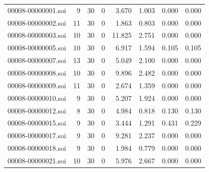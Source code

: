 \begin{tabular}{lrrrrrrr}
00008-00000001.soi & 9 & 30 & 0 & 3.670 & 1.003 & 0.000 & 0.000 \\
00008-00000002.soi & 11 & 30 & 0 & 1.863 & 0.803 & 0.000 & 0.000 \\
00008-00000003.soi & 10 & 30 & 0 & 11.825 & 2.751 & 0.000 & 0.000 \\
00008-00000005.soi & 10 & 30 & 0 & 6.917 & 1.594 & 0.105 & 0.105 \\
00008-00000007.soi & 13 & 30 & 0 & 5.049 & 2.100 & 0.000 & 0.000 \\
00008-00000008.soi & 10 & 30 & 0 & 9.896 & 2.482 & 0.000 & 0.000 \\
00008-00000009.soi & 11 & 30 & 0 & 2.674 & 1.359 & 0.000 & 0.000 \\
00008-00000010.soi & 9 & 30 & 0 & 5.207 & 1.924 & 0.000 & 0.000 \\
00008-00000012.soi & 8 & 30 & 0 & 4.984 & 0.818 & 0.130 & 0.130 \\
00008-00000015.soi & 9 & 30 & 0 & 3.444 & 1.291 & 0.431 & 0.229 \\
00008-00000017.soi & 9 & 30 & 0 & 9.281 & 2.237 & 0.000 & 0.000 \\
00008-00000018.soi & 9 & 30 & 0 & 1.984 & 0.779 & 0.000 & 0.000 \\
00008-00000021.soi & 10 & 30 & 0 & 5.976 & 2.667 & 0.000 & 0.000 \\
\bottomrule
\end{tabular}
